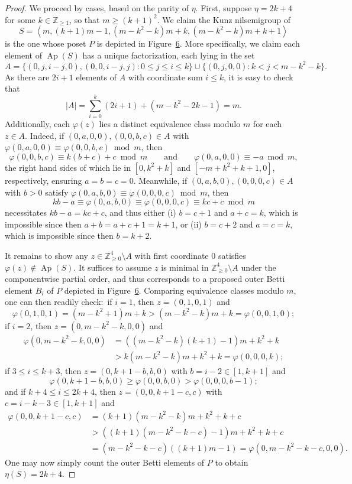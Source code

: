 \documentclass[10pt,a4paper]{amsart}
\newcommand\ZZ{\mathbb{Z}}
\DeclareMathOperator\Ap{Ap}
\begin{document}
\begin{proof}
We proceed by cases, based on the parity of $\eta$.  First, suppose $\eta = 2k + 4$ for some $k \in \ZZ_{\ge 1}$, so that $m \geq (k+1)^2$.  We claim the Kunz nilsemigroup of
$$S = \left\langle m,(k+1)m - 1,  (m-k^2-k)m +  k, (m-k^2-k)m +  k+1\right\rangle$$
is the one whose poset $P$ is depicted in Figure~\href{https://alco.centre-mersenne.org/articles/10.5802/alco.354/}{6}.  More specifically, we claim each element of $\Ap(S)$ has a unique factorization, each lying in the set 
$$A = \{(0, j, i-j, 0), (0, 0, i-j, j) : 0 \le j \le i \le k\} 
\cup \{(0, j, 0, 0) : k < j < m - k^2 - k\}.$$
As there are $2i + 1$ elements of $A$ with coordinate sum $i \le k$, it is easy to check that
$$|A| = \sum_{i=0}^{k} (2i+1) + (m - k^2 - 2k - 1) = m.$$
Additionally, each $\varphi(z)$ lies a distinct equivalence class modulo $m$ for each $z \in A$.  Indeed, if $(0,a,0,0), (0,0,b,c) \in A$ with $\varphi(0,a,0,0) \equiv \varphi(0,0,b,c) \bmod m$, then 
$$\varphi(0,0,b,c) \equiv k(b + c) + c \bmod m
\qquad \text{and} \qquad
\varphi(0,a,0,0) \equiv -a \bmod m,$$
the right hand sides of which lie in $[0, k^2 + k]$ and $[-m + k^2 + k + 1, 0]$, respectively, ensuring $a = b = c = 0$.  Meanwhile, if $(0,a,b,0), (0,0,0,c) \in A$ with $b > 0$ satisfy $\varphi(0,a,b,0) \equiv \varphi(0,0,0,c) \bmod m$, then 
$$kb - a \equiv \varphi(0,a,b,0) \equiv \varphi(0,0,0,c) \equiv kc + c \bmod m$$
necessitates $kb - a = kc + c$, and thus either (i) $b = c + 1$ and $a + c = k$, which is impossible since then $a + b = a + c + 1 = k + 1$, or (ii) $b = c + 2$ and $a = c = k$, which is impossible since then $b = k + 2$.  

It remains to show any $z \in \ZZ_{\ge 0}^4 \setminus A$ with first coordinate 0 satisfies $\varphi(z) \notin \Ap(S)$.  It suffices to assume $z$ is minimal in $\ZZ_{\ge 0}^4 \setminus A$ under the componentwise partial order, and thus corresponds to a proposed outer Betti element $B_i$ of $P$ depicted in Figure~\href{https://alco.centre-mersenne.org/articles/10.5802/alco.354/}{6}.  
Comparing equivalence classes modulo $m$, one can then readily check:\ if $i = 1$, then $z = (0,1,0,1)$ and
$$\varphi(0,1,0,1) = (m - k^2 + 1)m + k > (m - k^2 - k)m + k = \varphi(0,0,1,0);$$
if $i = 2$, then $z = (0, m - k^2-k, 0, 0)$ and 
\begin{align*}
    \varphi(0, m - k^2 - k, 0, 0) 
    &= ((m - k^2 - k)(k+1) - 1)m + k^2 + k \\
    &> k(m-k^2-k)m +  k^2 + k = \varphi(0, 0, 0, k);
\end{align*}
if $3 \le i \le k + 3$, then $z = (0, k+1-b, b, 0)$ with $b = i - 2 \in [1, k+1]$ and 
$$\varphi(0, k + 1 - b, b, 0) \ge \varphi(0, 0, b, 0) > \varphi(0, 0, 0, b - 1);$$
and if $k + 4 \le i \le 2k + 4$, then $z = (0, 0, k + 1 - c, c)$ with $c = i - k - 3 \in [1, k+1]$ and
\begin{align*}
    \varphi(0,0,k+1-c,c) 
    &= (k+1)(m-k^2-k)m + k^2 + k + c \\
    &> ((k+1)(m -k^2-k-c) - 1)m + k^2 + k + c \\
    &= (m -k^2-k-c)((k+1)m-1) = \varphi(0,m - k^2-k - c,0,0).
\end{align*}
One may now simply count the outer Betti elements of $P$ to obtain $\eta(S) = 2k + 4$.  


\end{proof}
\end{document}
